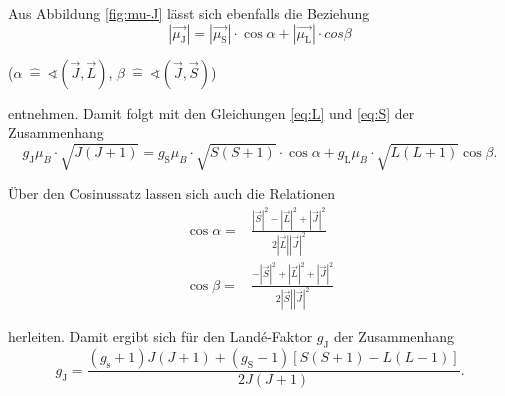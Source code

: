 Aus Abbildung \ref{fig:mu-J} lässt sich ebenfalls die Beziehung
\begin{equation}
  \left| \vec{\mu_\text{J}} \right| = \left| \vec{\mu_\text{S}} \right| \cdot \cos{\alpha}+ \left| \vec{\mu_\text{L}} \right| \cdot{cos{\beta}}
\end{equation}

\begin{center}
  \tiny {($ \alpha \: \hat{=} \: \sphericalangle \left( \vec{J}, \vec{L} \right) $, $ \beta \: \hat{=} \: \sphericalangle \left( \vec{J}, \vec{S} \right)$)}
\end{center}

entnehmen. Damit folgt mit den Gleichungen \eqref{eq:L} und \eqref{eq:S} der Zusammenhang
\begin{equation}
  g_\text{J} \mu_{B} \cdot \sqrt{J \left( J+ 1 \right)} = g_\text{S} \mu_{B} \cdot \sqrt{S \left( S + 1 \right)} \cdot \cos{\alpha} + g_\text{L} \mu_{B} \cdot \sqrt{L \left( L + 1\right)} \cos{\beta}  \text{.}
\end{equation}

\FloatBarrier

Über den Cosinussatz lassen sich auch die Relationen
\begin{align}
  \cos{\alpha} =& \frac{ \left| \vec{S} \right|^2 - \left| \vec{L} \right|^2 + \left| \vec{J} \right|^2 } { 2 \left| \vec{L} \right| \left| \vec{J} \right| ^2} \\
  \cos{\beta} =& \frac{ - \left| \vec{S} \right|^2 + \left| \vec{L} \right|^2 + \left| \vec{J} \right|^2}{2 \left| \vec{S} \right| \left| \vec{J} \right| ^2}
\end{align}


herleiten.
Damit ergibt sich für den Landé-Faktor $g_\text{J}$ der Zusammenhang
\begin{equation}
  g_\text{J} = \frac{ \left(g_\text{s} + 1 \right) J \left( J + 1 \right) + \left(g_\text{S} -1 \right) \left[ S \left( S + 1 \right) - L\left( L - 1 \right) \right] }{2 J \left( J + 1 \right)} . \label{eq:elg}
\end{equation}

